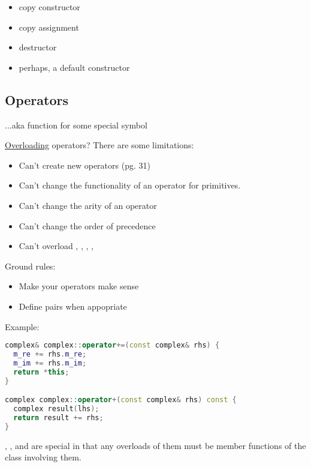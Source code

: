 \begin{itemize}
  \item copy constructor
  \item copy assignment
  \item destructor
  \item perhaps, a default constructor
\end{itemize}

\subsection{Operators}

...aka function for some special symbol

\underline{Overloading} operators? There are some limitations:

\begin{itemize}
  \item Can't create new operators (pg. 31)
  \item Can't change the functionality of an operator for primitives.
  \item Can't change the arity of an operator
  \item Can't change the order of precedence
  \item Can't overload \cpp{::}, , , , 
\end{itemize}

Ground rules:

\begin{itemize}
  \item Make your operators make sense
  \item Define pairs when appopriate 
\end{itemize}

Example:

\begin{lstlisting}[language=C++]
complex& complex::operator+=(const complex& rhs) {
  m_re += rhs.m_re;
  m_im += rhs.m_im;
  return *this;
}

complex complex::operator+(const complex& rhs) const {
  complex result(lhs);
  return result += rhs;
}
\end{lstlisting}

\cpp{[]}, \cpp{()}, and \cpp{=} are special in that any overloads of them must be member functions of the class involving them.